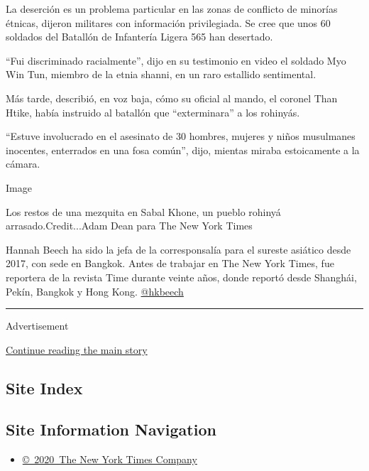 La deserción es un problema particular en las zonas de conflicto de
minorías étnicas, dijeron militares con información privilegiada. Se
cree que unos 60 soldados del Batallón de Infantería Ligera 565 han
desertado.

``Fui discriminado racialmente'', dijo en su testimonio en video el
soldado Myo Win Tun, miembro de la etnia shanni, en un raro estallido
sentimental.

Más tarde, describió, en voz baja, cómo su oficial al mando, el coronel
Than Htike, había instruido al batallón que ``exterminara'' a los
rohinyás.

``Estuve involucrado en el asesinato de 30 hombres, mujeres y niños
musulmanes inocentes, enterrados en una fosa común'', dijo, mientas
miraba estoicamente a la cámara.

Image

Los restos de una mezquita en Sabal Khone, un pueblo rohinyá
arrasado.Credit...Adam Dean para The New York Times

Hannah Beech ha sido la jefa de la corresponsalía para el sureste
asiático desde 2017, con sede en Bangkok. Antes de trabajar en The New
York Times, fue reportera de la revista Time durante veinte años, donde
reportó desde Shanghái, Pekín, Bangkok y Hong Kong.
\href{https://twitter.com/hkbeech}{@hkbeech}

\begin{center}\rule{0.5\linewidth}{\linethickness}\end{center}

Advertisement

\protect\hyperlink{after-bottom}{Continue reading the main story}

\hypertarget{site-index}{%
\subsection{Site Index}\label{site-index}}

\hypertarget{site-information-navigation}{%
\subsection{Site Information
Navigation}\label{site-information-navigation}}

\begin{itemize}
\tightlist
\item
  \href{https://help.nytimes3xbfgragh.onion/hc/en-us/articles/115014792127-Copyright-notice}{©~2020~The
  New York Times Company}
\end{itemize}

